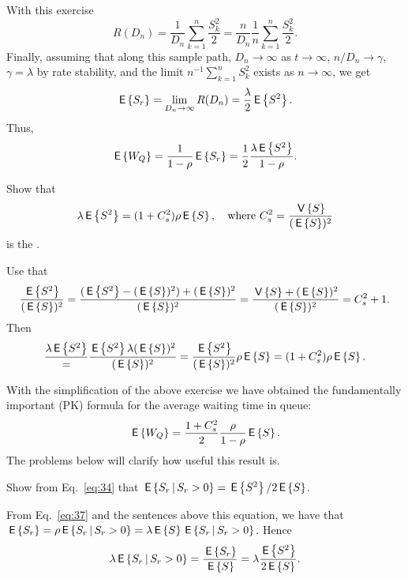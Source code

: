 With this exercise
\begin{equation*}
R(D_n)
= \frac{1}{D_n} \sum_{k=1}^n \frac{S_k^2}2 = \frac{n}{D_n} \frac 1 n\sum_{k=1}^n \frac{S_k^2}2.
\end{equation*}
Finally, assuming that along this sample path, $D_n\to \infty$ as
$t\to \infty$, $n/D_n \to \gamma$, $\gamma=\lambda$ by rate stability,
and the limit $n^{-1}\sum_{k=1}^n S_k^2$ exists as $n\to\infty$, we
get
\begin{equation}\label{eq:34}
\E{S_r} = \lim_{D_n\to\infty} R(D_n) = \frac{\lambda}2 \E{S^2}.
\end{equation}
Thus, 
\begin{equation*} 
  \E{W_Q} = \frac1{1-\rho} \E{S_r} =\frac 1 2 \frac{\lambda \E{S^2}}{1-\rho}.
\end{equation*}

\begin{exercise}
Show that
\begin{equation}\label{eq:32}
  \lambda \E{S^2} = (1+C_s^2)\rho\E S, \quad\text{where }
 C_s^2 = \frac{\V S }{(\E S)^2}
\end{equation}
is the .
\begin{solution}
Use that 
\begin{equation*}
  \frac{\E{S^2}}{(\E S)^2} = 
  \frac{(\E{S^2}-(\E S)^2) + (\E S)^2}{(\E S)^2} =
  \frac{\V S + (\E S)^2}{(\E S)^2} =
  C_s^2 + 1.
\end{equation*}
Then
\begin{equation*}
  \frac{\lambda\E{S^2}} = \frac{\E{S^2}\lambda(\E S)^2}{(\E S)^2}=
 \frac{\E{S^2}}{(\E S)^2} \rho \E S = (1+C_s^2) \rho \E{S}.
\end{equation*}
\end{solution}
\end{exercise}

With the simplification of the above exercise  we have obtained the fundamentally important  (PK) formula for the average waiting time in queue:
\begin{equation} \label{eq:710}
  \E{W_Q} =\frac{1 + C_s^2}2 \frac{\rho}{1-\rho}  \E S.
\end{equation}
The problems below will clarify how useful this result is.


\begin{exercise}\label{ex:9}
Show  from Eq.~\eqref{eq:34} that $\E{S_r\given S_r>0} = \E{S^2}/2 \E S$.
\begin{solution}
 From Eq.~\eqref{eq:37} and the sentences above this equation,
    we have that
    $\E{S_r} = \rho \E{S_r\given S_r>0}=\lambda \E S \E{S_r\given S_r>0}$. Hence
    \begin{equation*}
    \lambda \E{S_r\given S_r>0} = \frac{\E{S_r}}{\E S} = \lambda \frac{\E{S^2}}{2 \E S}.
    \end{equation*}
\end{solution}
\end{exercise}


